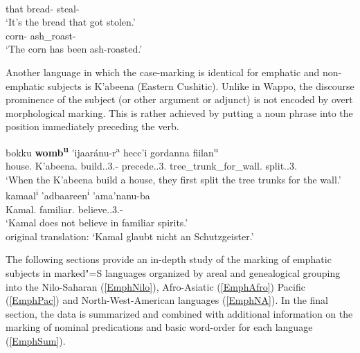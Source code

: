 \begin{exe}\ex\label{WapFoc}
\begin{xlist}
\ex\gll{}   \\
that bread-\nom{} \foc{} steal-\pass{}\\
\glt `It's the bread that got stolen.'
\ex\gll{} \\
corn-\nom{} ash\_roast-\pass{}\\
\glt `The corn has been ash-roasted.'
\end{xlist}
\end{exe}

Another language in which the case-marking is identical for emphatic and non-emphatic subjects is K'abeena (Eastern Cushitic).
Unlike in Wappo, the discourse prominence of the subject (or other argument or adjunct) is not encoded by overt morphological marking. 
This is rather achieved by putting a noun phrase into the position immediately preceding the verb.

\begin{exe}\ex{}
\begin{xlist}\ex\raggedright \gll bokku \textbf{womb\textsuperscript{u}} \'{}ijaar\'anu-r\textsuperscript{a} hecc'i gordanna fiilan\textsuperscript{u}\\
house.\acc{} K'abeena.\nom{} build.\ipfv{}.3\sg{}.\mas{}-\tmp{} precede.\cvb{}.3\sg{}.\mas{} tree\_trunk\_for\_wall.\acc{} split.\ipfv{}.3\sg{}.\mas{}\\
\glt `When the K'abeena build a house, they first split the tree trunks for the wall.'%
\ex\gll kamaal\textsuperscript{i} 'adbaareen\textsuperscript{i} 'ama'nanu-ba\\
Kamal.\nom{} familiar.\loc{} believe.\ipfv{}.3\sg{}.\mas{}-\Neg{}\\
\glt `Kamal does not believe in familiar spirits.'\\
 original translation: `Kamal glaubt nicht an Schutzgeister.'
\end{xlist}
\end{exe}

The following sections provide an in-depth study of the marking of emphatic subjects in marked"=S languages organized by areal and genealogical grouping into the Nilo-Saharan (\ref{EmphNilo}), Afro-Asiatic (\ref{EmphAfro}) Pacific (\ref{EmphPac}) and North-West-Ame\-ri\-can languages (\ref{EmphNA}). 
In the final section, the data is summarized and combined with additional information on the marking of nominal predications and basic word-order for each language (\ref{EmphSum}).

